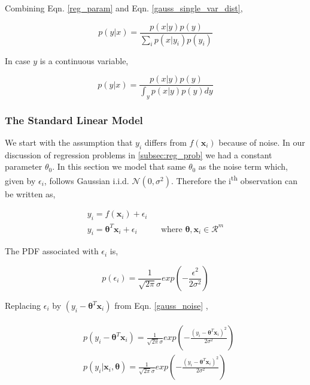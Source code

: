 \documentclass[english]{tktltiki}
\begin{document}
Combining Eqn. \ref{reg_param} and Eqn. \ref{gauss_single_var_dist},

\begin{equation}
p(y|x) = \frac{p(x|y)p(y)}{\sum_i{p(x|y_i)p(y_i)}}
\end{equation}

In case $y$ is a continuous variable,

\begin{equation}
p(y|x) = \frac{p(x|y)p(y)}{\int_y{p(x|y)p(y)dy}}
\end{equation}

\subsubsection{The Standard Linear Model}

We start with the assumption that $y_i$ differs from $f(\mathbf{x}_i)$ because of noise. In our discussion of regression problems in \ref{subsec:reg_prob} we had a constant parameter $\theta_0$. In this section we model that same $\theta_0$ as the noise term which, given by $\epsilon_i$, follows Gaussian i.i.d. $\mathcal{N}(0, \sigma ^2)$. Therefore the i\textsuperscript{th} observation can be written as,

\begin{eqnarray}
\label{eqn:standard_linear_model}
y_i = f(\mathbf{x}_i) + \epsilon_i \nonumber \\
y_i = \boldsymbol\theta ^T \mathbf{x}_i + \epsilon_i && \text{where $\boldsymbol\theta, \mathbf{x}_i \in \mathcal{R}^m$}
\label{gauss_noise}
\end{eqnarray}

The PDF associated with $\epsilon_i$ is,

\begin{equation}
p(\epsilon_i) = \frac{1}{\sqrt{2 \pi} \sigma} exp(-\frac{\epsilon^2}{2 \sigma^2})
\end{equation}


Replacing $\epsilon_i$ by $(y_i - \boldsymbol\theta ^T \mathbf{x}_i)$ from Eqn. \ref{gauss_noise} ,

\begin{eqnarray}
\begin{split}
	&p(y_i - \boldsymbol\theta ^T \mathbf{x}_i) = \frac{1}{\sqrt{2 \pi} \sigma} exp(-\frac{(y_i - \boldsymbol\theta ^T \mathbf{x}_i)^2}{2 \sigma^2}) \\
	&p(y_i | \mathbf{x}_i, \boldsymbol\theta) = \frac{1}{\sqrt{2 \pi} \sigma} exp(-\frac{(y_i - \boldsymbol\theta ^T \mathbf{x}_i)^2}{2 \sigma^2})
\end{split}
\end{eqnarray}
\end{document}
